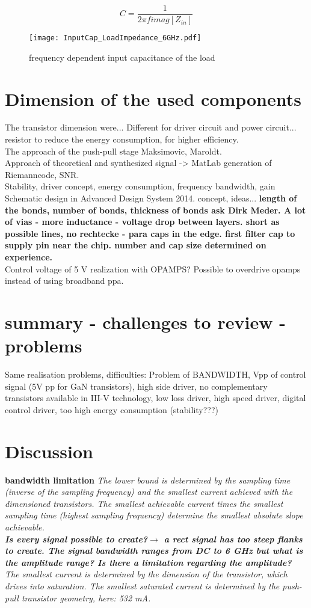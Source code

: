 \begin{equation}
C = \frac{1}{2 \pi f imag[Z_{in}]}
\end{equation}

 \begin{figure}[ht]
	\centering
  \texttt{[image: InputCap\_LoadImpedance\_6GHz.pdf]}
	\caption{frequency dependent input capacitance of the load}
	\label{fig:smith_load_impedance_inC}
\end{figure}
\section{Dimension of the used components}
The transistor dimension were... Different for driver circuit and power circuit... resistor to reduce the energy  consumption, for higher efficiency. \\ The
approach of the push-pull stage Maksimovic, Maroldt.\\
Approach of theoretical and synthesized signal -> MatLab generation of Riemanncode, SNR.\\ Stability, driver concept, energy consumption, frequency bandwidth, gain
Schematic design in Advanced Design System 2014. concept, ideas... 
\textbf{length of the bonds, number of bonds, thickness of bonds ask Dirk Meder. A lot of vias - more inductance - voltage drop between layers. short as possible lines, no rechtecke - para caps in the edge. first filter cap to supply pin near the chip. number and cap size determined on experience. }\\
Control voltage of 5 V realization with OPAMPS? Possible to overdrive opamps instead of using broadband ppa. 


\section{summary - challenges to review - problems}
Same realisation problems, difficulties: Problem of BANDWIDTH, Vpp of control signal (5V pp for GaN transistors), high side driver, no complementary transistors available in III-V technology, low loss driver, high speed driver, digital control driver, too high energy consumption (stability???)
\section{Discussion}
\textbf{bandwidth limitation}
\textit{The lower bound is determined by the sampling time (inverse of the sampling frequency) and the smallest current achieved with the dimensioned transistors.
 The smallest achievable current times the smallest sampling time (highest sampling frequency) determine the smallest absolute slope achievable. \\
 \textbf{Is every signal possible to create?$\rightarrow$ a rect signal has too steep flanks to create. The signal bandwidth ranges from DC to 6 GHz but what is the amplitude range? Is there a limitation regarding the amplitude?}
\\
The smallest current is determined by the dimension of the transistor, which drives into saturation. 
The smallest saturated current is determined by the push-pull transistor geometry, here: 532 mA.}